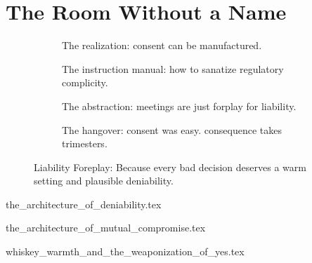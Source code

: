\section{The Room Without a Name}

\vfill

\begin{figure}[H]
  \centering

  \begin{subfigure}[t]{0.45\textwidth}
  \centering
  \caption*{The realization: consent can be manufactured.}
  \end{subfigure}
  \hfill
  \begin{subfigure}[t]{0.45\textwidth}
  \centering
  \caption*{The instruction manual: how to sanatize regulatory complicity.}
  \end{subfigure}

  \vspace{1em}

  \begin{subfigure}[t]{0.45\textwidth}
  \centering
  \caption*{The abstraction: meetings are just forplay for liability.}
  \end{subfigure}
  \hfill
  \begin{subfigure}[t]{0.45\textwidth}
  \centering
  \caption*{The hangover: consent was easy. consequence takes trimesters.}
  \end{subfigure}

  \caption*{Liability Foreplay: Because every bad decision deserves a warm setting and plausible deniability.}
\end{figure}


{the_architecture_of_deniability.tex}

{the_architecture_of_mutual_compromise.tex}

{whiskey_warmth_and_the_weaponization_of_yes.tex}